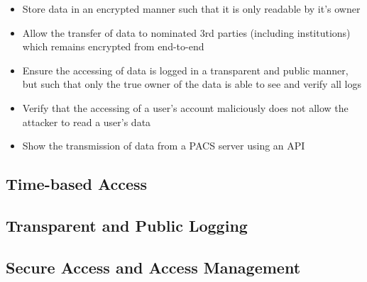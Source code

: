 \begin{itemize}
  \item{Store data in an encrypted manner such that it is only readable by it's owner}
  \item{Allow the transfer of data to nominated 3rd parties (including institutions) which remains encrypted from end-to-end}
  \item{Ensure the accessing of data is logged in a transparent and public manner, but such that only the true owner of the data is able to see and verify all logs}
  \item{Verify that the accessing of a user's account maliciously does not allow the attacker to read a user's data}
  \item{Show the transmission of data from a PACS server using an API}
\end{itemize}

\subsection{Time-based Access}

\subsection{Transparent and Public Logging}

\subsection{Secure Access and Access Management}

